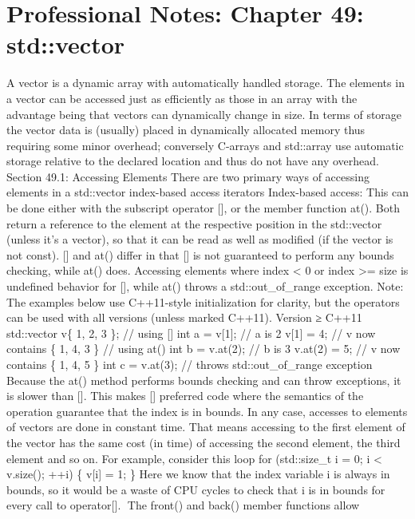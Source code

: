 \hypertarget{professional-notes-chapter-49-stdvector-1}{%
\chapter{Professional Notes: Chapter 49:
std::vector}\label{professional-notes-chapter-49-stdvector-1}}

A vector is a dynamic array with automatically handled storage. The
elements in a vector can be accessed just as eﬃciently as those in an
array with the advantage being that vectors can dynamically change in
size. In terms of storage the vector data is (usually) placed in
dynamically allocated memory thus requiring some minor overhead;
conversely C-arrays and std::array use automatic storage relative to the
declared location and thus do not have any overhead. Section 49.1:
Accessing Elements There are two primary ways of accessing elements in a
std::vector index-based access iterators Index-based access: This can be
done either with the subscript operator {[}{]}, or the member function
at(). Both return a reference to the element at the respective position
in the std::vector (unless it's a vector), so that it can be read as
well as modiﬁed (if the vector is not const). {[}{]} and at() diﬀer in
that {[}{]} is not guaranteed to perform any bounds checking, while at()
does. Accessing elements where index \textless{} 0 or index
\textgreater= size is undeﬁned behavior for {[}{]}, while at() throws a
std::out\_of\_range exception. Note: The examples below use C++11-style
initialization for clarity, but the operators can be used with all
versions (unless marked C++11). Version ≥ C++11 std::vector v\{ 1, 2, 3
\}; // using {[}{]} int a = v{[}1{]}; // a is 2 v{[}1{]} = 4; // v now
contains \{ 1, 4, 3 \} // using at() int b = v.at(2); // b is 3 v.at(2)
= 5; // v now contains \{ 1, 4, 5 \} int c = v.at(3); // throws
std::out\_of\_range exception Because the at() method performs bounds
checking and can throw exceptions, it is slower than {[}{]}. This makes
{[}{]} preferred code where the semantics of the operation guarantee
that the index is in bounds. In any case, accesses to elements of
vectors are done in constant time. That means accessing to the ﬁrst
element of the vector has the same cost (in time) of accessing the
second element, the third element and so on. For example, consider this
loop for (std::size\_t i = 0; i \textless{} v.size(); ++i) \{ v{[}i{]} =
1; \} Here we know that the index variable i is always in bounds, so it
would be a waste of CPU cycles to check that i is in bounds for every
call to operator{[}{]}. The front() and back() member functions allow
